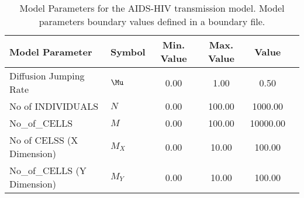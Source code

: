 \begin{table}
\centering
\begin{tabular}{p{5cm}lcccc}
{\bf Model Parameter} & {\bf Symbol} & {\bf Min. Value} & {\bf Max. Value} & {\bf Value}\\
\hline\hline
Diffusion Jumping Rate & $\Mu$ & 0.00 & 1.00 & 0.50\\
No of INDIVIDUALS & $N$ & 0.00 & 100.00 & 1000.00\\
No_of_CELLS & $M$ & 0.00 & 100.00 & 10000.00\\
No of CELSS (X Dimension) & $M_X$ & 0.00 & 10.00 & 100.00\\
No_of_CELLS (Y Dimension) & $M_Y$ & 0.00 & 10.00 & 100.00\\
\hline\hline
\end{tabular}
\caption{Model Parameters for the AIDS-HIV transmission model. Model parameters boundary values defined in a boundary file.}
\end{table}
